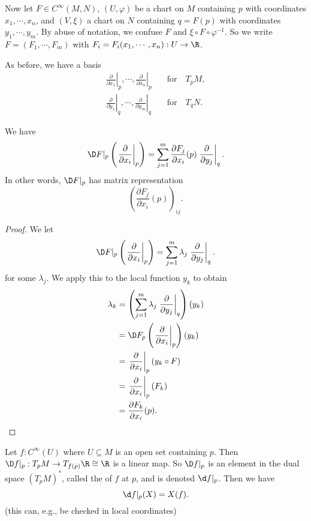 \documentclass[a4paper]{article}
\begin{document}
Now let $F \in C^\infty(M, N)$, $(U, \varphi)$ be a chart on $M$ containing $p$ with coordinates $x_1, \cdots, x_n$, and $(V, \xi)$ a chart on $N$ containing $q = F(p)$ with coordinates $y_1,\cdots, y_m$. By abuse of notation, we confuse $F$ and $\xi \circ F \circ \varphi^{-1}$. So we write $F = (F_1, \cdots, F_m)$ with $F_i = F_i(x_1, \cdots, x_n): U \to \R$.

As before, we have a basis
\begin{align*}
  \left.\frac{\partial}{\partial x_1}\right|_p, \cdots, \left.\frac{\partial}{\partial x_n}\right|_p&\quad\text{for}\quad T_pM,\\
  \left.\frac{\partial}{\partial y_1}\right|_q, \cdots, \left.\frac{\partial}{\partial y_m}\right|_q&\quad\text{for}\quad T_qN.
\end{align*}

\begin{lemma}
  We have
  \[
    \D F|_p \left(\left.\frac{\partial}{\partial x_i}\right|_p\right) = \sum_{j = 1}^m \frac{\partial F_j}{\partial x_i}(p) \left.\frac{\partial}{\partial y_j}\right|_q.
  \]
  In other words, $\D F|_p$ has matrix representation
  \[
    \left(\frac{\partial F_j}{\partial x_i}(p)\right)_{ij}.
  \]
\end{lemma}

\begin{proof}
  We let
  \[
    \D F|_p \left(\left.\frac{\partial}{\partial x_i}\right|_p\right) = \sum_{j = 1}^m \lambda_j \left.\frac{\partial}{\partial y_j}\right|_q.
  \]
  for some $\lambda_j$. We apply this to the local function $y_k$ to obtain
  \begin{align*}
    \lambda_k &= \left(\sum_{j = 1}^m \lambda_j \left.\frac{\partial}{\partial y_j}\right|_q\right)(y_k)\\
    &= \D F_p \left(\left.\frac{\partial}{\partial x_i}\right|_p\right)(y_k)\\
    &= \left.\frac{\partial}{\partial x_i}\right|_p (y_k \circ F) \\
    &= \left.\frac{\partial}{\partial x_i}\right|_p(F_k) \\
    &= \frac{\partial F_k}{\partial x_i}(p). \qedhere
  \end{align*}
\end{proof}

\begin{eg}
  Let $f: C^\infty(U)$ where $U \subseteq M$ is an open set containing $p$. Then $\D f|_p: T_p M \to T_{f(p)} \R \cong \R$ is a linear map. So $\D f|_p$ is an element in the dual space $(T_pM)^*$, called the  of $f$ at $p$, and is denoted $\d f|_p$. Then we have
  \[
    \d f|_p(X) = X(f).
  \]
  (this can, e.g., be checked in local coordinates)
\end{eg}
\end{document}
